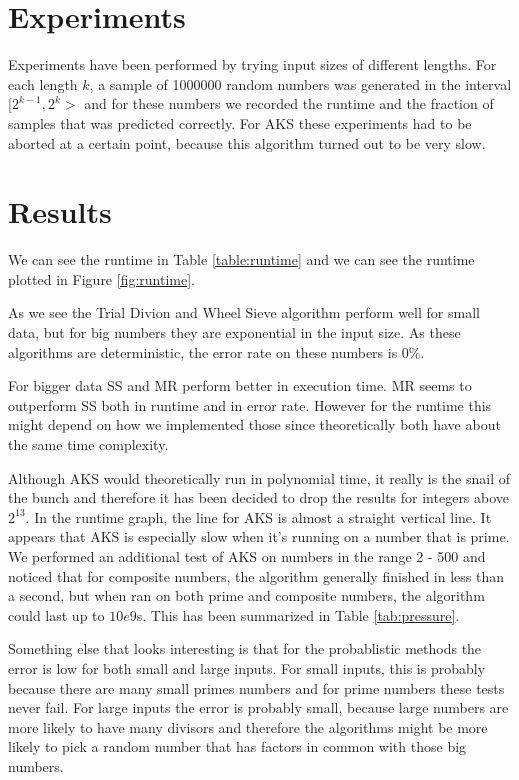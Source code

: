 
\section{Experiments}
\label{sec:experiments}

Experiments have been performed by trying input sizes of different lengths.
For each length $k$, a sample of 1000000 random numbers was generated in the interval $[2^{k-1}, 2^k>$ and for these numbers we recorded the runtime and the fraction of samples that was predicted correctly.
    For AKS these experiments had to be aborted at a certain point, because this algorithm turned out to be very slow.

\section{Results}
\label{sec:results}

We can see the runtime in Table \ref{table:runtime} and we can see the runtime plotted in Figure \ref{fig:runtime}.

As we see the Trial Divion and Wheel Sieve algorithm perform well for small data, but for big numbers they are exponential in the input size.
As these algorithms are deterministic, the error rate on these numbers is $0\%$.

For bigger data SS and MR perform better in execution time.
MR seems to outperform SS both in runtime and in error rate.
However for the runtime this might depend on how we implemented those since theoretically both have about the same time complexity.

Although AKS would theoretically run in polynomial time, it really is the snail of the bunch and therefore it has been decided to drop the results for integers above $2^{13}$.
In the runtime graph, the line for AKS is almost a straight vertical line.
It appears that AKS is especially slow when it's running on a number that is prime.
We performed an additional test of AKS on numbers in the range 2 - 500 and noticed that for composite numbers, the algorithm generally finished in less than a second, but when ran on both prime and composite numbers, the algorithm could last up to $10e9$s.
This has been summarized in Table \ref{tab:pressure}.

Something else that looks interesting is that for the probablistic methods the error is low for both small and large inputs.
For small inputs, this is probably because there are many small primes numbers and for prime numbers these tests never fail. %
For large inputs the error is probably small, because large numbers are more likely to have many divisors and therefore the algorithms might be more likely to pick a random number that has factors in common with those big numbers.

